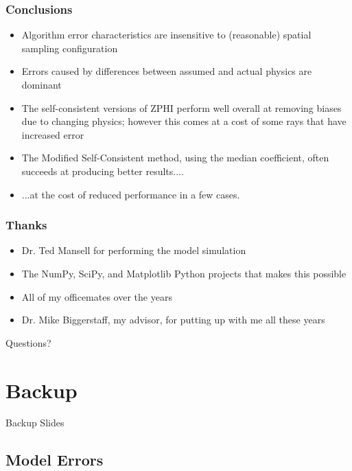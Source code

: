 \documentclass[red]{beamer}
\begin{document}
\begin{frame}[<+->]
	\frametitle{Conclusions}
	\begin{itemize}
		\item Algorithm error characteristics are insensitive to (reasonable) spatial sampling configuration
		\item Errors caused by differences between assumed and actual physics are dominant
		\item The self-consistent versions of ZPHI perform well overall at removing biases due to changing physics; however this comes
		at a cost of some rays that have increased error
		\item The Modified Self-Consistent method, using the median coefficient,
		often succeeds at producing better results....
		\item ...at the cost of reduced performance in a few cases.
	\end{itemize}
\end{frame}

\begin{frame}
	\frametitle{Thanks}
	\begin{itemize}
		\item Dr. Ted Mansell for performing the model simulation
		\item The NumPy, SciPy, and Matplotlib Python projects that makes this possible
		\item All of my officemates over the years
		\item Dr. Mike Biggerstaff, my advisor, for putting up with me all these years
	\end{itemize}
	\begin{center}
		\large{Questions?}
	\end{center}
\end{frame}

\appendix
{}
\setcounter{finalframe}{\value{framenumber}}
\section{Backup}
\begin{frame}
	\begin{center}
		Backup Slides
	\end{center}
\end{frame}

\subsection{Model Errors}
\end{document}
